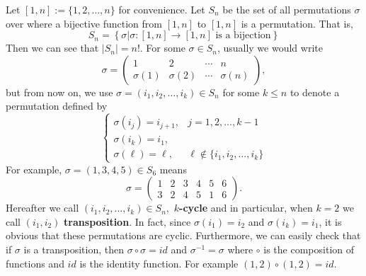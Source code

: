\documentclass{article}
\begin{document}
Let $[1,n]:=\{1,2,\ldots,n\}$ for convenience.
Let $S_n$ be the set of all permutations $\sigma$ over  where a bijective function from 
$[1,n]$ to $[1,n]$ is a permutation. That is,
\begin{equation*}
S_n=\left\{\sigma\big|\text{$\sigma:[1,n]\rightarrow[1,n]$ is a bijection}\right\}
\end{equation*}
Then we can see that $|S_n|=n!$. For some $\sigma\in S_n$, usually we would write
\begin{equation*}
\sigma=\begin{pmatrix}
		1 & 2 & \cdots & n\\
		\sigma(1) & \sigma(2) & \cdots & \sigma(n) 
		\end{pmatrix},
\end{equation*}
but from now on, we use $\sigma=(i_1,i_2,\ldots, i_k)\in S_n$ for some $k\leq n$ to denote
a permutation defined by
\begin{equation*}
\begin{cases}
\sigma(i_j)=i_{j+1}, & \text{$j=1,2,\ldots,k-1$}\\
\sigma(i_k)=i_1, & \\
\sigma(\ell)=\ell, & \text{$\ell\not\in\{i_1,i_2,\ldots,i_k\}$}
\end{cases}
\end{equation*}
For example, $\sigma=(1,3,4,5)\in S_6$ means 
\begin{equation*}
\sigma = \begin{pmatrix}
			1 & 2 & 3 & 4 & 5 & 6\\
			3 & 2 & 4 & 5 & 1 & 6
		\end{pmatrix}.
\end{equation*}
Hereafter we call $(i_1,i_2,\ldots,i_k)\in S_n,$  \textbf{$k$-cycle} and in particular, when $k=2$ we call $(i_1,i_2)$ 
\textbf{transposition}. In fact, since $\sigma(i_1)=i_2$ and $\sigma(i_k)=i_1$,
it is obvious that these permutations are cyclic.
Furthermore, we can easily check that if $\sigma$ is a transposition, then $\sigma\circ\sigma=id$ and 
$\sigma^{-1}=\sigma$ where $\circ$ is the composition of functions
and $id$ is the identity function.
For example $(1,2)\circ (1,2)=id$.
\end{document}
